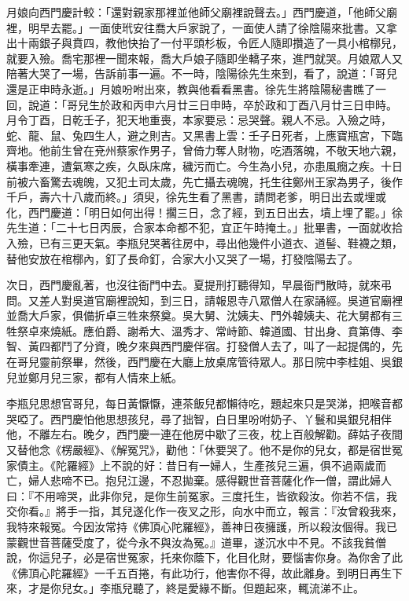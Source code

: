 \begin{showcontents}{}
月娘向西門慶計較：「還對親家那裡並他師父廟裡說聲去。」西門慶道，「他師父廟裡，明早去罷。」一面使玳安往喬大戶家說了，一面使人請了徐陰陽來批書。又拿出十兩銀子與賁四，教他快抬了一付平頭杉板，令匠人隨即攢造了一具小棺槨兒，就要入殮。喬宅那裡一聞來報，喬大戶娘子隨即坐轎子來，進門就哭。月娘眾人又陪著大哭了一場，告訴前事一遍。不一時，陰陽徐先生來到，看了，說道：「哥兒還是正申時永逝。」月娘吩咐出來，教與他看看黑書。徐先生將陰陽秘書瞧了一回，說道：「哥兒生於政和丙申六月廿三日申時，卒於政和丁酉八月廿三日申時。月令丁酉，日乾壬子，犯天地重喪，本家要忌：忌哭聲。親人不忌。入殮之時，蛇、龍、鼠、兔四生人，避之則吉。又黑書上雲：壬子日死者，上應寶瓶宮，下臨齊地。他前生曾在兗州蔡家作男子，曾倚力奪人財物，吃酒落魄，不敬天地六親，橫事牽連，遭氣寒之疾，久臥床席，穢污而亡。今生為小兒，亦患風癇之疾。十日前被六畜驚去魂魄，又犯土司太歲，先亡攝去魂魄，托生往鄭州王家為男子，後作千戶，壽六十八歲而終。」須臾，徐先生看了黑書，請問老爹，明日出去或埋或化，西門慶道：「明日如何出得！擱三日，念了經，到五日出去，墳上埋了罷。」徐先生道：「二十七日丙辰，合家本命都不犯，宜正午時掩土。」批畢書，一面就收拾入殮，已有三更天氣。李瓶兒哭著往房中，尋出他幾件小道衣、道髻、鞋襪之類，替他安放在棺槨內，釘了長命釘，合家大小又哭了一場，打發陰陽去了。

次日，西門慶亂著，也沒往衙門中去。夏提刑打聽得知，早晨衙門散時，就來弔問。又差人對吳道官廟裡說知，到三日，請報恩寺八眾僧人在家誦經。吳道官廟裡並喬大戶家，俱備折卓三牲來祭奠。吳大舅、沈姨夫、門外韓姨夫、花大舅都有三牲祭卓來燒紙。應伯爵、謝希大、溫秀才、常峙節、韓道國、甘出身、賁第傳、李智、黃四都鬥了分資，晚夕來與西門慶伴宿。打發僧人去了，叫了一起提偶的，先在哥兒靈前祭畢，然後，西門慶在大廳上放桌席管待眾人。那日院中李桂姐、吳銀兒並鄭月兒三家，都有人情來上紙。

李瓶兒思想官哥兒，每日黃懨懨，連茶飯兒都懶待吃，題起來只是哭涕，把喉音都哭啞了。西門慶怕他思想孩兒，尋了拙智，白日里吩咐奶子、丫鬟和吳銀兒相伴他，不離左右。晚夕，西門慶一連在他房中歇了三夜，枕上百般解勸。薛姑子夜間又替他念《楞嚴經》、《解冤咒》，勸他：「休要哭了。他不是你的兒女，都是宿世冤家債主。《陀羅經》上不說的好：昔日有一婦人，生產孩兒三遍，俱不過兩歲而亡，婦人悲啼不已。抱兒江邊，不忍拋棄。感得觀世音菩薩化作一僧，謂此婦人曰：『不用啼哭，此非你兒，是你生前冤家。三度托生，皆欲殺汝。你若不信，我交你看。』將手一指，其兒遂化作一夜叉之形，向水中而立，報言：『汝曾殺我來，我特來報冤。今因汝常持《佛頂心陀羅經》，善神日夜擁護，所以殺汝個得。我已蒙觀世音菩薩受度了，從今永不與汝為冤。』道畢，遂沉水中不見。不該我貧僧說，你這兒子，必是宿世冤家，托來你蔭下，化目化財，要惱害你身。為你舍了此《佛頂心陀羅經》一千五百捲，有此功行，他害你不得，故此離身。到明日再生下來，才是你兒女。」李瓶兒聽了，終是愛緣不斷。但題起來，輒流涕不止。


\end{showcontents}

